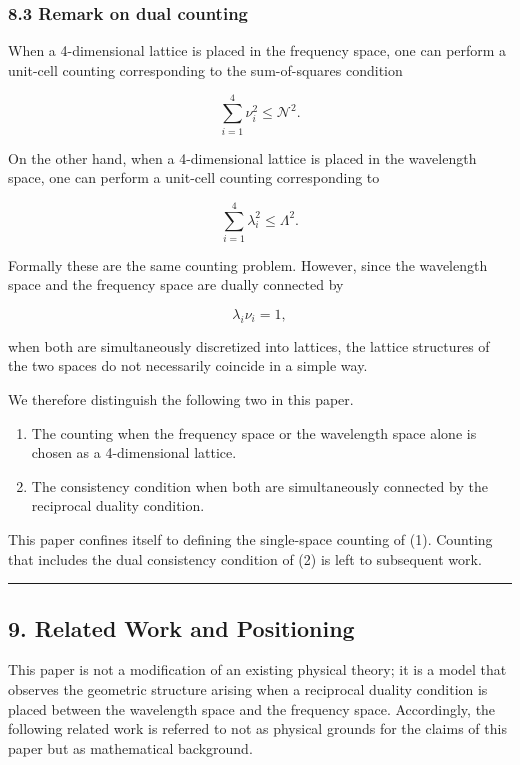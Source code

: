 \documentclass[
]{article}
\providecommand{\tightlist}{%
  \setlength{\itemsep}{0pt}\setlength{\parskip}{0pt}}
\begin{document}
\subsubsection{8.3 Remark on dual
counting}\label{remark-on-dual-counting}

When a 4-dimensional lattice is placed in the frequency space, one can
perform a unit-cell counting corresponding to the sum-of-squares
condition

\[
\sum_{i=1}^{4} \nu_i^2\le \mathcal{N}^2 .
\]

On the other hand, when a 4-dimensional lattice is placed in the
wavelength space, one can perform a unit-cell counting corresponding to

\[
\sum_{i=1}^{4} \lambda_i^2\le \Lambda^2 .
\]

Formally these are the same counting problem. However, since the
wavelength space and the frequency space are dually connected by

\[
\lambda_i\nu_i=1 ,
\]

when both are simultaneously discretized into lattices, the lattice
structures of the two spaces do not necessarily coincide in a simple
way.

We therefore distinguish the following two in this paper.

\begin{enumerate}
\def\labelenumi{\arabic{enumi}.}
\tightlist
\item
  The counting when the frequency space or the wavelength space alone is
  chosen as a 4-dimensional lattice.\\
\item
  The consistency condition when both are simultaneously connected by
  the reciprocal duality condition.
\end{enumerate}

This paper confines itself to defining the single-space counting of (1).
Counting that includes the dual consistency condition of (2) is left to
subsequent work.

\begin{center}\rule{0.5\linewidth}{0.5pt}\end{center}

\subsection{9. Related Work and
Positioning}\label{related-work-and-positioning}

This paper is not a modification of an existing physical theory; it is a
model that observes the geometric structure arising when a reciprocal
duality condition is placed between the wavelength space and the
frequency space. Accordingly, the following related work is referred to
not as physical grounds for the claims of this paper but as mathematical
background.
\end{document}
